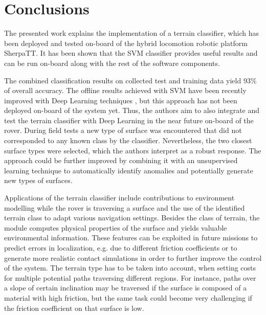 
\section{Conclusions}

The presented work explains the implementation of a terrain classifier, which has been deployed and tested on-board of the hybrid locomotion robotic platform SherpaTT.
It has been shown that the SVM classifier provides useful results and can be run on-board along with the rest of the software components.

The combined classification results on collected test and training data yield 93\% of overall accuracy.
The offline results achieved with SVM have been recently improved with Deep Learning techniques \cite{ugenti2021}, but this approach has not been deployed on-board of the system yet.
Thus, the authors aim to also integrate and test the terrain classifier with Deep Learning in the near future on-board of the rover.
During field tests a new type of surface was encountered that did not corresponded to any known class by the classifier. 
Nevertheless, the two closest surface types were selected, which the authors interpret as a robust response.
The approach could be further improved by combining it with an unsupervised learning technique to automatically identify anomalies and potentially generate new types of surfaces.

Applications of the terrain classifier include contributions to environment modelling while the rover is traversing a surface and the use of the identified terrain class to adapt various navigation settings.
Besides the  class of terrain, the module computes physical properties of the surface and yields valuable environmental information. 
These features can be exploited in future missions to predict errors in localization, e.g. due to different friction coefficients or to generate more realistic contact simulations in order to further improve the control of the system.
The terrain type has to be taken into account, when setting costs for multiple potential paths traversing different regions. 
For instance, paths over a slope of certain inclination may be traversed if the surface is composed of a material with high friction, but the same task could become very challenging if the friction coefficient on that surface is low. 

